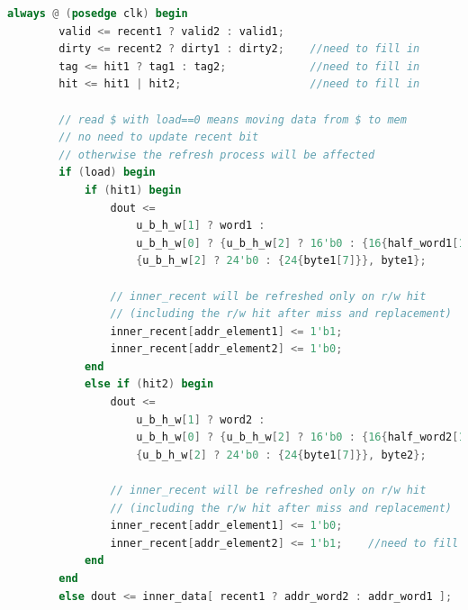 \begin{lstlisting}[language = {verilog}]
    always @ (posedge clk) begin
        valid <= recent1 ? valid2 : valid1;
        dirty <= recent2 ? dirty1 : dirty2;    //need to fill in
        tag <= hit1 ? tag1 : tag2;             //need to fill in
        hit <= hit1 | hit2;                    //need to fill in
        
        // read $ with load==0 means moving data from $ to mem
        // no need to update recent bit
        // otherwise the refresh process will be affected
        if (load) begin
            if (hit1) begin
                dout <=
                    u_b_h_w[1] ? word1 :
                    u_b_h_w[0] ? {u_b_h_w[2] ? 16'b0 : {16{half_word1[15]}}, half_word1} :
                    {u_b_h_w[2] ? 24'b0 : {24{byte1[7]}}, byte1};
                
                // inner_recent will be refreshed only on r/w hit
                // (including the r/w hit after miss and replacement)
                inner_recent[addr_element1] <= 1'b1;
                inner_recent[addr_element2] <= 1'b0;
            end
            else if (hit2) begin
                dout <=
                    u_b_h_w[1] ? word2 :
                    u_b_h_w[0] ? {u_b_h_w[2] ? 16'b0 : {16{half_word2[15]}}, half_word2} :
                    {u_b_h_w[2] ? 24'b0 : {24{byte1[7]}}, byte2};
                
                // inner_recent will be refreshed only on r/w hit
                // (including the r/w hit after miss and replacement)
                inner_recent[addr_element1] <= 1'b0;
                inner_recent[addr_element2] <= 1'b1;    //need to fill in
            end
        end
        else dout <= inner_data[ recent1 ? addr_word2 : addr_word1 ];


\end{lstlisting}
